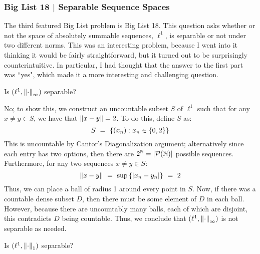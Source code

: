 \subsubsection{Big List 18 | Separable Sequence Spaces}

The third featured Big List problem is Big List 18. This question asks whether
or not the space of absolutely summable sequences, $ \ell^{1} $, is separable or
not under two different norms. This was an interesting problem, because I went
into it thinking it would be fairly straightforward, but it turned out to be
surprisingly counterintuitive. In particular, I had thought that the answer to
the first part was ``yes", which made it a more interesting and challenging
question.

\begin{qu}[num=18.1]
    Is $ (\ell^{1},\left\|\cdot\right\|_{\infty}) $ separable?
\end{qu}

\begin{soln}
    No; to show this, we construct an uncountable subset $ S $ of $ \ell^{1} $
    such that for any $ x \neq y \in S $, we have that $ \left\|x-y\right\| = 2 $. To do
    this, define $ S $ as:
    \begin{equation*}
        S \ = \ \left\{{(x_{n}):x_{n} \in \left\{{0, 2}\right\}}\right\}
    \end{equation*}
    This is uncountable by Cantor's Diagonalization argument; alternatively
    since each entry has two options, then there are $ 2^{\mathbb{N}} =
    \abs{\mathcal{P}(\mathbb{N})} $ possible sequences. Furthermore, for any two sequences
    $ x \neq y \in S $:
    \begin{equation*}
        \norm{x-y} \ = \ \sup\set{\abs{x_{n}-y_{n}}} \ = \ 2
    \end{equation*}
    Thus, we can place a ball of radius 1 around every point in $ S $. Now, if
    there was a countable dense subset $ D $, then there must be some element of
    $ D $ in each ball. However, because there are uncountably many balls, each
    of which are disjoint, this contradicts $ D $ being countable. Thus, we
    conclude that $ (\ell^{1},\left\|\cdot\right\|_{\infty}) $ is not separable as
    needed.
\end{soln}

\begin{qu}[num=18.2]
    Is $ (\ell^{1},\left\|\cdot\right\|_{1}) $ separable?
\end{qu}

